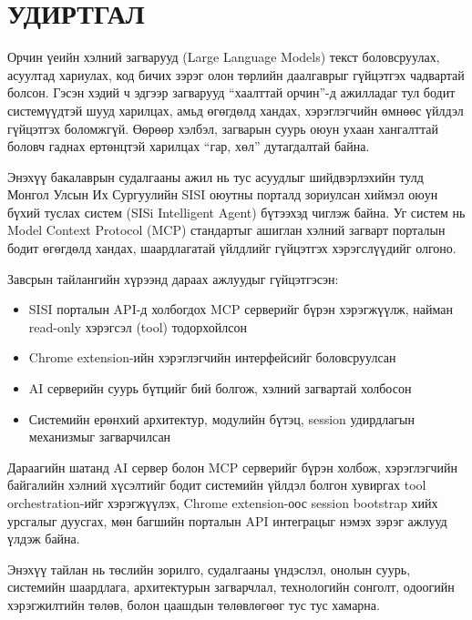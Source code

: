 \documentclass[12pt,a4paper]{report}
\begin{document}
\cleardoublepage
{}
\tableofcontents
\listoffigures
\listoftables

\cleardoublepage
{}
\setcounter{page}{1}

\chapter*{УДИРТГАЛ}

Орчин үеийн хэлний загварууд (Large Language Models) текст боловсруулах, асуултад хариулах, код бичих зэрэг олон төрлийн даалгаврыг гүйцэтгэх чадвартай болсон. Гэсэн хэдий ч эдгээр загварууд ``хаалттай орчин''-д ажилладаг тул бодит системүүдтэй шууд харилцах, амьд өгөгдөлд хандах, хэрэглэгчийн өмнөөс үйлдэл гүйцэтгэх боломжгүй. Өөрөөр хэлбэл, загварын суурь оюун ухаан хангалттай боловч гаднах ертөнцтэй харилцах ``гар, хөл'' дутагдалтай байна.

Энэхүү бакалаврын судалгааны ажил нь тус асуудлыг шийдвэрлэхийн тулд Монгол Улсын Их Сургуулийн SISI оюутны порталд зориулсан хиймэл оюун бүхий туслах систем (SISi Intelligent Agent) бүтээхэд чиглэж байна. Уг систем нь Model Context Protocol (MCP) стандартыг ашиглан хэлний загварт порталын бодит өгөгдөлд хандах, шаардлагатай үйлдлийг гүйцэтгэх хэрэгслүүдийг олгоно.

Завсрын тайлангийн хүрээнд дараах ажлуудыг гүйцэтгэсэн:

\begin{itemize}
  \item SISI порталын API-д холбогдох MCP серверийг бүрэн хэрэгжүүлж, найман read-only хэрэгсэл (tool) тодорхойлсон
  \item Chrome extension-ийн хэрэглэгчийн интерфейсийг боловсруулсан
  \item AI серверийн суурь бүтцийг бий болгож, хэлний загвартай холбосон
  \item Системийн ерөнхий архитектур, модулийн бүтэц, session удирдлагын механизмыг загварчилсан
\end{itemize}

Дараагийн шатанд AI сервер болон MCP серверийг бүрэн холбож, хэрэглэгчийн байгалийн хэлний хүсэлтийг бодит системийн үйлдэл болгон хувиргах tool orchestration-ийг хэрэгжүүлэх, Chrome extension-оос session bootstrap хийх урсгалыг дуусгах, мөн багшийн порталын API интеграцыг нэмэх зэрэг ажлууд үлдэж байна.

Энэхүү тайлан нь төслийн зорилго, судалгааны үндэслэл, онолын суурь, системийн шаардлага, архитектурын загварчлал, технологийн сонголт, одоогийн хэрэгжилтийн төлөв, болон цаашдын төлөвлөгөөг тус тус хамарна.
\end{document}
